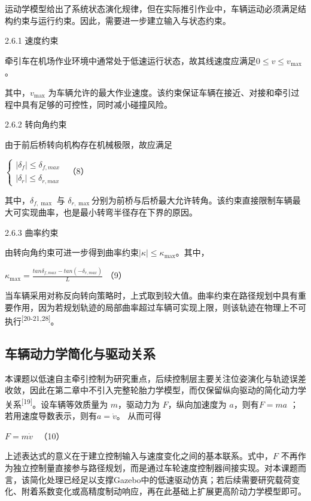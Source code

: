 运动学模型给出了系统状态演化规律，但在实际推引作业中，车辆运动必须满足结构约束与运行约束。因此，需要进一步建立输入与状态约束。

2.6.1 速度约束

牵引车在机场作业环境中通常处于低速运行状态，故其线速度应满足\(0 \leq v \leq v_{\max}\)
。

其中，\(v_{\max}\)
为车辆允许的最大作业速度。该约束保证车辆在接近、对接和牵引过程中具有足够的可控性，同时减小碰撞风险。

2.6.2 转向角约束

由于前后桥转向机构存在机械极限，故应满足

\(\left\{ \begin{array}{r}
 \mid \delta_{f} \mid \leq \delta_{f,max} \\
 \mid \delta_{r} \mid \leq \delta_{r,max}
\end{array} \right.\ \) （8）

其中，\(\delta_{f,\max}\) 与
\(\delta_{r,\max}\)分别为前桥与后桥最大允许转角。该约束直接限制车辆最大可实现曲率，也是最小转弯半径存在下界的原因。

2.6.3 曲率约束

由转向角约束可进一步得到曲率约束\(\mid \kappa \mid \leq \kappa_{\max}\)。其中，

\(\kappa_{\max} = \frac{tan\delta_{f,max} - tan( - \delta_{r,max})}{L}\)
（9）

当车辆采用对称反向转向策略时，上式取到较大值。曲率约束在路径规划中具有重要作用，因为若规划轨迹的局部曲率超过车辆可实现上限，则该轨迹在物理上不可执行\textsuperscript{[20-21,28]}。

\subsection{车辆动力学简化与驱动关系}

本课题以低速自主牵引控制为研究重点，后续控制层主要关注位姿演化与轨迹误差收敛，因此在第二章中不引入完整轮胎力学模型，而仅保留纵向驱动的简化动力学关系\textsuperscript{[19]}。设车辆等效质量为
\(m\)，驱动力为 \(F\)，纵向加速度为 \(a\)，则有\(F = ma\)
；若用速度导数表示，则有\(a = \dot{v}\)。\(
\) 从而可得

\(F = m\dot{v}\ \ \) （10）

上述表达式的意义在于建立控制输入与速度变化之间的基本联系。式中，\(F\)
不再作为独立控制量直接参与路径规划，而是通过车轮速度控制器间接实现。对本课题而言，该简化处理已经足以支撑Gazebo中的低速驱动仿真；若后续需要研究载荷变化、附着系数变化或高精度制动响应，再在此基础上扩展更高阶动力学模型即可。

